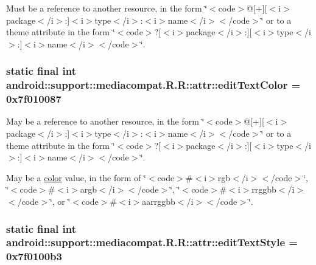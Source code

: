 Must be a reference to another resource, in the form \char`\"{}$<$code$>$@\mbox{[}+\mbox{]}\mbox{[}$<$i$>$package$<$/i$>$:\mbox{]}$<$i$>$type$<$/i$>$:$<$i$>$name$<$/i$>$$<$/code$>$\char`\"{} or to a theme attribute in the form \char`\"{}$<$code$>$?\mbox{[}$<$i$>$package$<$/i$>$:\mbox{]}\mbox{[}$<$i$>$type$<$/i$>$:\mbox{]}$<$i$>$name$<$/i$>$$<$/code$>$\char`\"{}. \hypertarget{classandroid_1_1support_1_1mediacompat_1_1_r_1_1attr_b91fbcfa420b4f717d687ccf136ee707}{
\subsubsection[{editTextColor}]{\setlength{\rightskip}{0pt plus 5cm}static final int android::support::mediacompat.R.R::attr::editTextColor = 0x7f010087}}
\label{classandroid_1_1support_1_1mediacompat_1_1_r_1_1attr_b91fbcfa420b4f717d687ccf136ee707}


May be a reference to another resource, in the form \char`\"{}$<$code$>$@\mbox{[}+\mbox{]}\mbox{[}$<$i$>$package$<$/i$>$:\mbox{]}$<$i$>$type$<$/i$>$:$<$i$>$name$<$/i$>$$<$/code$>$\char`\"{} or to a theme attribute in the form \char`\"{}$<$code$>$?\mbox{[}$<$i$>$package$<$/i$>$:\mbox{]}\mbox{[}$<$i$>$type$<$/i$>$:\mbox{]}$<$i$>$name$<$/i$>$$<$/code$>$\char`\"{}. 

May be a \hyperlink{classandroid_1_1support_1_1mediacompat_1_1_r_1_1color}{color} value, in the form of \char`\"{}$<$code$>$\#$<$i$>$rgb$<$/i$>$$<$/code$>$\char`\"{}, \char`\"{}$<$code$>$\#$<$i$>$argb$<$/i$>$$<$/code$>$\char`\"{}, \char`\"{}$<$code$>$\#$<$i$>$rrggbb$<$/i$>$$<$/code$>$\char`\"{}, or \char`\"{}$<$code$>$\#$<$i$>$aarrggbb$<$/i$>$$<$/code$>$\char`\"{}. \hypertarget{classandroid_1_1support_1_1mediacompat_1_1_r_1_1attr_e32970ae0a194ab50c533b772893b59f}{
\subsubsection[{editTextStyle}]{\setlength{\rightskip}{0pt plus 5cm}static final int android::support::mediacompat.R.R::attr::editTextStyle = 0x7f0100b3}}
\label{classandroid_1_1support_1_1mediacompat_1_1_r_1_1attr_e32970ae0a194ab50c533b772893b59f}


